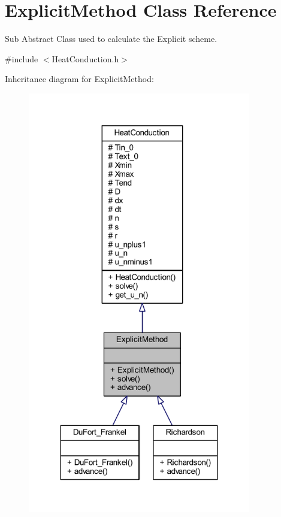 \hypertarget{class_explicit_method}{}\section{Explicit\+Method Class Reference}
\label{class_explicit_method}


Sub Abstract Class used to calculate the Explicit scheme.  




{\ttfamily \#include $<$Heat\+Conduction.\+h$>$}



Inheritance diagram for Explicit\+Method\+:
\nopagebreak
\begin{figure}[H]
\begin{center}
\leavevmode
\includegraphics[width=276pt]{class_explicit_method__inherit__graph}
\end{center}
\end{figure}


